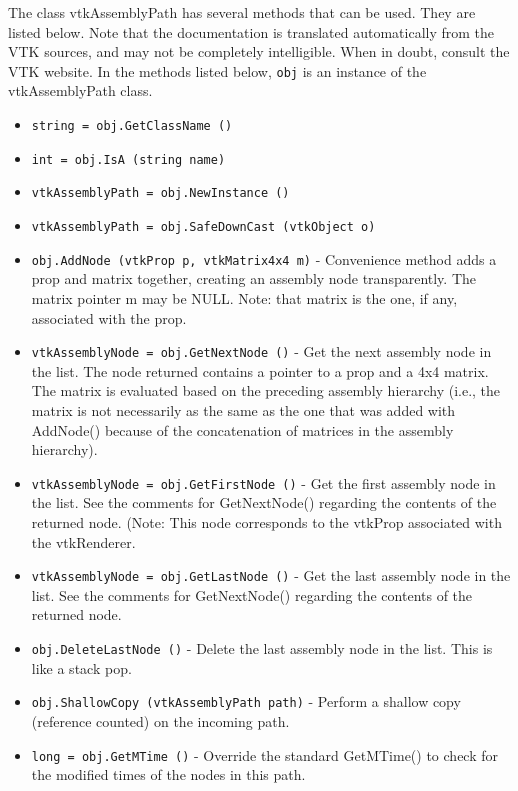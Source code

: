 The class vtkAssemblyPath has several methods that can be used.
  They are listed below.
Note that the documentation is translated automatically from the VTK sources,
and may not be completely intelligible.  When in doubt, consult the VTK website.
In the methods listed below, \verb|obj| is an instance of the vtkAssemblyPath class.
\begin{itemize}
\item  \verb|string = obj.GetClassName ()|

\item  \verb|int = obj.IsA (string name)|

\item  \verb|vtkAssemblyPath = obj.NewInstance ()|

\item  \verb|vtkAssemblyPath = obj.SafeDownCast (vtkObject o)|

\item  \verb|obj.AddNode (vtkProp p, vtkMatrix4x4 m)| -  Convenience method adds a prop and matrix together,
 creating an assembly node transparently. The matrix
 pointer m may be NULL. Note: that matrix is the one,
 if any, associated with the prop. 

\item  \verb|vtkAssemblyNode = obj.GetNextNode ()| -  Get the next assembly node in the list. The node returned
 contains a pointer to a prop and a 4x4 matrix. The matrix
 is evaluated based on the preceding assembly hierarchy
 (i.e., the matrix is not necessarily as the same as the
 one that was added with AddNode() because of the 
 concatenation of matrices in the assembly hierarchy).

\item  \verb|vtkAssemblyNode = obj.GetFirstNode ()| -  Get the first assembly node in the list. See the comments for
 GetNextNode() regarding the contents of the returned node. (Note: This
 node corresponds to the vtkProp associated with the vtkRenderer.

\item  \verb|vtkAssemblyNode = obj.GetLastNode ()| -  Get the last assembly node in the list. See the comments
 for GetNextNode() regarding the contents of the returned node.

\item  \verb|obj.DeleteLastNode ()| -  Delete the last assembly node in the list. This is like
 a stack pop.

\item  \verb|obj.ShallowCopy (vtkAssemblyPath path)| -  Perform a shallow copy (reference counted) on the
 incoming path.

\item  \verb|long = obj.GetMTime ()| -  Override the standard GetMTime() to check for the modified times
 of the nodes in this path.

\end{itemize}
